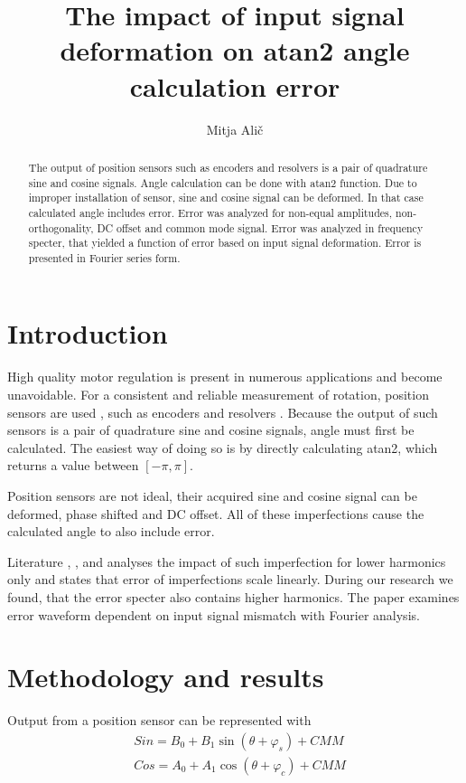 \documentclass[a4paper]{article}
\begin{document}
\title{The impact of input signal deformation on atan2 angle calculation error}
\author{Mitja Alič}
\maketitle

\begin{abstract}{}
The output of position sensors such as encoders and resolvers is a pair of quadrature sine and cosine signals.
Angle calculation can be done with atan2 function. Due to improper installation of sensor, sine and cosine signal can be deformed. In that case calculated angle includes error. Error was analyzed for non-equal amplitudes, non-orthogonality, DC offset and common mode signal. Error was analyzed in frequency specter, that yielded a function of error based on input signal deformation. Error is presented in Fourier series form.
\end{abstract}


\section{Introduction}
High quality motor regulation is present in numerous applications and become unavoidable. For a consistent and reliable measurement of rotation, position sensors are used \cite{uporaba_senzorjev}, such as encoders and resolvers \cite{inkrementalni}\cite{resolver}\cite{enkoder}. Because the output of such sensors is a pair of quadrature sine and cosine signals, angle must first be calculated. The easiest way of doing so is by directly calculating atan2, which returns a value between $[-\pi, \pi]$.

Position sensors are not ideal, their acquired sine and cosine signal can be deformed, phase shifted and DC offset. All of these imperfections cause the calculated angle to also include error.

Literature  \cite{orbis}, \cite{RLS1}, \cite{RLS2} and \cite{RLS3} analyses the impact of such imperfection for lower harmonics only and states that error of imperfections scale linearly. During our research we found, that the error specter also contains higher harmonics. The paper examines error waveform dependent on input signal mismatch with Fourier analysis. 

\section{Methodology and results}
Output from a position sensor can be represented with
\begin{eqnarray}
\label{equ:def_sin}
&Sin = B_{0} + B_1 \sin(\theta + \varphi_{s}) + CMM\\
\label{equ:def_cos}
&Cos = A_{0} + A_1 \cos(\theta + \varphi_{c}) + CMM
\end{eqnarray}
\end{document}
